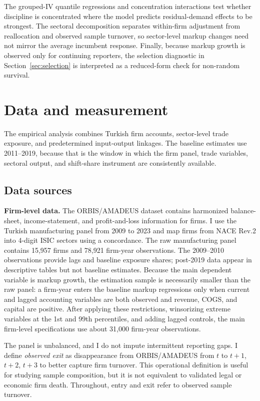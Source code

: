 \documentclass[12pt]{article}
\begin{document}
The grouped-IV quantile regressions and concentration interactions test whether discipline is concentrated where the model predicts residual-demand effects to be strongest. The sectoral decomposition separates within-firm adjustment from reallocation and observed sample turnover, so sector-level markup changes need not mirror the average incumbent response. Finally, because markup growth is observed only for continuing reporters, the selection diagnostic in Section~\ref{sec:selection} is interpreted as a reduced-form check for non-random survival.

\section{Data and measurement}
The empirical analysis combines Turkish firm accounts, sector-level trade exposure, and predetermined input-output linkages. The baseline estimates use 2011--2019, because that is the window in which the firm panel, trade variables, sectoral output, and shift-share instrument are consistently available.

\subsection{Data sources}
\textbf{Firm-level data.} The ORBIS/AMADEUS dataset contains harmonized balance-sheet, income-statement, and profit-and-loss information for firms. I use the Turkish manufacturing panel from 2009 to 2023 and map firms from NACE Rev.2 into 4-digit ISIC sectors using a concordance. The raw manufacturing panel contains 15,957 firms and 78,921 firm-year observations. The 2009--2010 observations provide lags and baseline exposure shares; post-2019 data appear in descriptive tables but not baseline estimates. Because the main dependent variable is markup growth, the estimation sample is necessarily smaller than the raw panel: a firm-year enters the baseline markup regressions only when current and lagged accounting variables are both observed and revenue, COGS, and capital are positive. After applying these restrictions, winsorizing extreme variables at the 1st and 99th percentiles, and adding lagged controls, the main firm-level specifications use about 31,000 firm-year observations.

The panel is unbalanced, and I do not impute intermittent reporting gaps. I define \emph{observed exit} as disappearance from ORBIS/AMADEUS from $t$ to $t+1$, $t+2$, $t+3$ to better capture firm turnover. This operational definition is useful for studying sample composition, but it is not equivalent to validated legal or economic firm death. Throughout, entry and exit refer to observed sample turnover.
\end{document}
